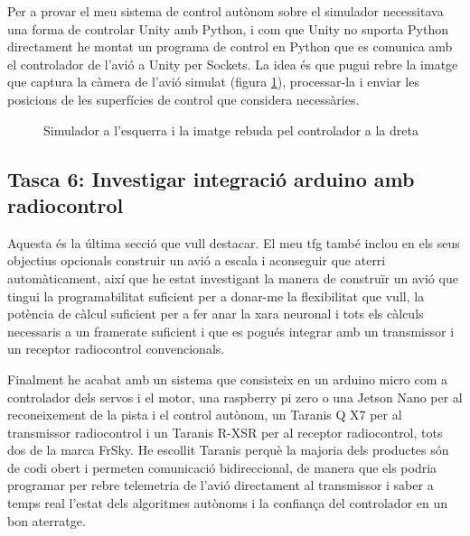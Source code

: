 \documentclass[10pt,a4paper,twocolumn,twoside]{article}
\begin{document}
Per a provar el meu sistema de control autònom sobre el simulador necessitava una forma de controlar Unity amb Python, i com que Unity no suporta
Python directament he montat un programa de control en Python que es comunica amb el controlador de l'avió a Unity per Sockets. La idea és que
pugui rebre la imatge que captura la càmera de l'avió simulat (figura \ref{fig-simulador-controlador}), processar-la i enviar les posicions de les superfícies de control que considera
necessàries.

\begin{figure}[h]
\centering
{}
    \caption{Simulador a l'esquerra i la imatge rebuda pel controlador a la dreta}
    \label{fig-simulador-controlador}
\end{figure}

\subsection{Tasca 6: Investigar integració arduino amb radiocontrol}
Aquesta és la última secció que vull destacar. El meu tfg també inclou en els seus objectius opcionals construir un avió a escala i aconseguir
que aterri automàticament, així que he estat investigant la manera de construïr un avió que tingui la programabilitat suficient per a donar-me
la flexibilitat que vull, la potència de càlcul suficient per a fer anar la xara neuronal i tots els càlculs necessaris a un framerate suficient
i que es pogués integrar amb un transmissor i un receptor radiocontrol convencionals.

Finalment he acabat amb un sistema que consisteix en un arduino micro com a controlador dels servos i el motor, una raspberry pi zero o 
una Jetson Nano per al reconeixement de la pista i el control autònom, un Taranis Q X7 per al transmissor radiocontrol i un Taranis R-XSR
per al receptor radiocontrol, tots dos de la marca FrSky. He escollit Taranis perquè la majoria dels productes són de codi obert i permeten
comunicació bidireccional, de manera que els podria programar per rebre telemetria de l'avió directament al transmissor i saber a temps real
l'estat dels algoritmes autònoms i la confiança del controlador en un bon aterratge.




\end{document}
